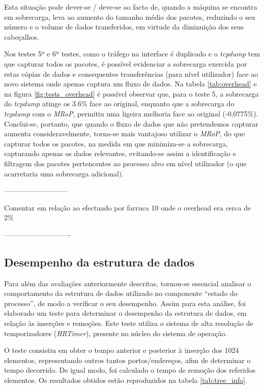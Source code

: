 Esta situação pode dever-se / deve-se ao facto de, quando a máquina se encontra em sobrecarga, leva ao aumento do tamanho médio dos pacotes, reduzindo o seu número e o volume de dados transferidos, em virtude da diminuição dos seus cabeçalhos.

Nos testes 5º e 6º testes, como o tráfego na interface é duplicado e o \textit{tcpdump} tem que capturar todos os pacotes, é possível evidenciar a sobrecarga exercida por estas cópias de dados e consequentes transferências (para nível utilizador) face ao novo sistema onde apenas captura um fluxo de dados.
Na tabela \ref{tab:overhead} e na figura \ref{fig:tests_overhead} é possível observar que, para o teste 5, a sobrecarga do \textit{tcpdump} atinge os 3.6\% face ao original, enquanto que a sobrecarga do \textit{tcpdump} com o \textit{MRoP}, permitiu uma ligeira melhoria face ao original (-0.0775\%).
Conclui-se, portanto, que quando o fluxo de dados que não pretendemos capturar aumenta consideravelmente, torna-se mais vantajoso utilizar o \textit{MRoP}, do que capturar todos os pacotes, na medida em que minimiza-se a sobrecarga, capturando apenas os dados relevantes, evitando-se assim a identificação e filtragem dos pacotes pertencentes ao processo alvo em nível utilizador (o que acarretaria uma sobrecarga adicional).

---------------------------

Comentar em relação ao efectuado por farruca 10 onde o overhead era cerca de 2\% 

----------------------------

\subsection{Desempenho da estrutura de dados}

Para além das avaliações anteriormente descritas, tornou-se essencial analisar o comportamento da estrutura de dados utilizado no componente “estado do processo”, de modo a verificar o seu desempenho.
Assim para esta análise, foi elaborado um teste para determinar o desempenho da estrutura de dados, em relação às inserções e remoções.
Este teste utiliza o sistema de alta resolução de temporizadores (\textit{HRTimer})\cite{hrtimerKernel}, presente no núcleo do sistema de operação.

O teste consistiu em obter o tempo anterior e posterior à inserção dos 1024 elementos, representando outros tantos portos/endereços, afim de determinar o tempo decorrido.
De igual modo, foi calculado o tempo de remoção dos referidos elementos.
Os resultados obtidos estão reproduzidos na tabela \ref{tab:tree_info}.


